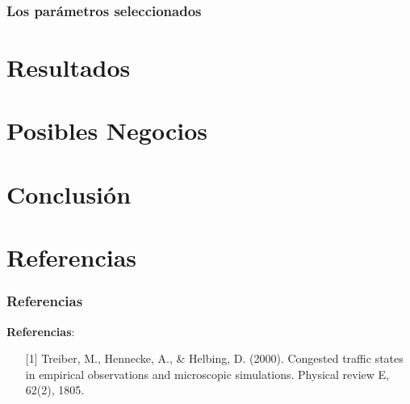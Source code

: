 \documentclass[10pt, compress]{beamer}
\begin{document}
\begin{frame}[fragile]

\frametitle{Los par\'ametros seleccionados}


\end{frame}

\section{Resultados}

\section{Posibles Negocios}

\section{Conclusi\'on}

\section{Referencias}

\begin{frame}[fragile]

\frametitle{Referencias}

\textbf{Referencias}:
\begin{itemize}
\item [{[1]}] Treiber, M., Hennecke, A., \& Helbing, D. (2000). Congested traffic states in empirical observations and microscopic simulations. Physical review E, 62(2), 1805.
\end{itemize}

\end{frame}

\end{document}
